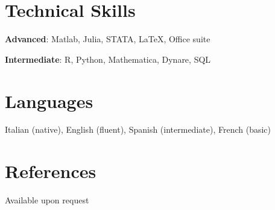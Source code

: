 \documentclass[11pt,a4paper]{article}
\begin{document}
\section{Technical Skills}

\noindent\textbf{Advanced}: Matlab, Julia, STATA, \LaTeX, Office suite

\noindent\textbf{Intermediate}: R, Python, Mathematica, Dynare, SQL

\section{Languages}

Italian (native), English (fluent), Spanish (intermediate), French (basic)








\section{References}

Available upon request
\end{document}
